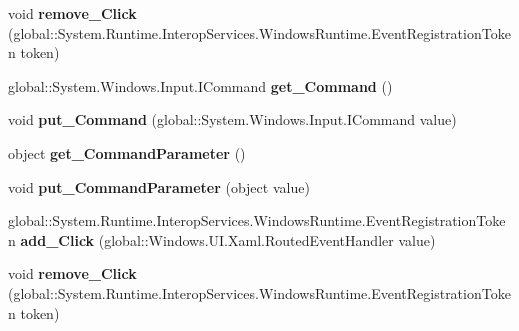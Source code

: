 \begin{DoxyCompactItemize}
void {\bfseries remove\+\_\+\+Click} (global\+::\+System.\+Runtime.\+Interop\+Services.\+Windows\+Runtime.\+Event\+Registration\+Token token)
\item 
\mbox{\label{interface_windows_1_1_u_i_1_1_xaml_1_1_controls_1_1_primitives_1_1_i_button_base_a32d7306ce7ae819ba8afcf8654502772}} 
global\+::\+System.\+Windows.\+Input.\+I\+Command {\bfseries get\+\_\+\+Command} ()
\item 
\mbox{\label{interface_windows_1_1_u_i_1_1_xaml_1_1_controls_1_1_primitives_1_1_i_button_base_a9a50f3b26afbef855e934ed8c1aa1c7a}} 
void {\bfseries put\+\_\+\+Command} (global\+::\+System.\+Windows.\+Input.\+I\+Command value)
\item 
\mbox{\label{interface_windows_1_1_u_i_1_1_xaml_1_1_controls_1_1_primitives_1_1_i_button_base_a844671cebaf433eca7be5733492d0c32}} 
object {\bfseries get\+\_\+\+Command\+Parameter} ()
\item 
\mbox{\label{interface_windows_1_1_u_i_1_1_xaml_1_1_controls_1_1_primitives_1_1_i_button_base_ae70dfa727c7375ca02faf4ed550e7941}} 
void {\bfseries put\+\_\+\+Command\+Parameter} (object value)
\item 
\mbox{\label{interface_windows_1_1_u_i_1_1_xaml_1_1_controls_1_1_primitives_1_1_i_button_base_a810a2e8203417bd2fe1eb15adc0d85b5}} 
global\+::\+System.\+Runtime.\+Interop\+Services.\+Windows\+Runtime.\+Event\+Registration\+Token {\bfseries add\+\_\+\+Click} (global\+::\+Windows.\+U\+I.\+Xaml.\+Routed\+Event\+Handler value)
\item 
\mbox{\label{interface_windows_1_1_u_i_1_1_xaml_1_1_controls_1_1_primitives_1_1_i_button_base_a96ebd008b8c4baa9c89c7671ec31b0a3}} 
void {\bfseries remove\+\_\+\+Click} (global\+::\+System.\+Runtime.\+Interop\+Services.\+Windows\+Runtime.\+Event\+Registration\+Token token)

\end{DoxyCompactItemize}
